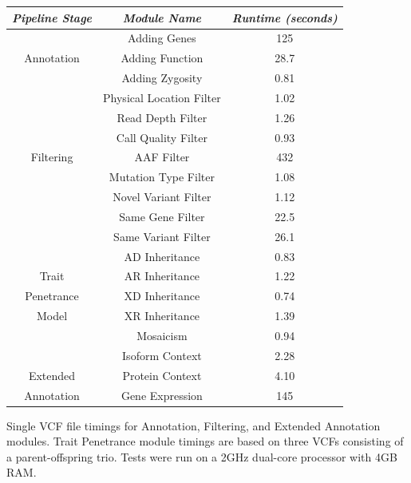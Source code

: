 \documentclass{bioinfo}
\begin{document}
\begin{table}[!t]
{\begin{tabular}{| c | *2c |} \hline %
\emph{Pipeline Stage} & \emph{Module Name} & \emph{Runtime (seconds)} \\
\hline
             & Adding Genes     & 125\\
Annotation   & Adding Function & 28.7\\
             & Adding Zygosity & 0.81\\
\hline
             & Physical Location Filter & 1.02 \\
             & Read Depth Filter        & 1.26 \\
             & Call Quality Filter      & 0.93\\
Filtering    & AAF Filter               & 432\\
             & Mutation Type Filter     & 1.08\\
             & Novel Variant Filter     & 1.12\\
             & Same Gene Filter       & 22.5\\
             & Same Variant Filter    & 26.1\\
\hline
             & AD Inheritance    & 0.83\\
 Trait       & AR Inheritance    & 1.22\\
Penetrance   & XD Inheritance    & 0.74\\
  Model      & XR Inheritance    & 1.39\\
             & Mosaicism         & 0.94\\
\hline
                 & Isoform Context      & 2.28\\
   Extended      & Protein Context      & 4.10\\
 Annotation      & Gene Expression      & 145\\
\hline
\end{tabular}}
{Single VCF file timings for Annotation, Filtering, and Extended Annotation modules. Trait Penetrance module timings are based on three VCFs consisting of a parent-offspring trio. Tests were run on a 2GHz dual-core processor with 4GB RAM.}
\end{table}
\end{document}
